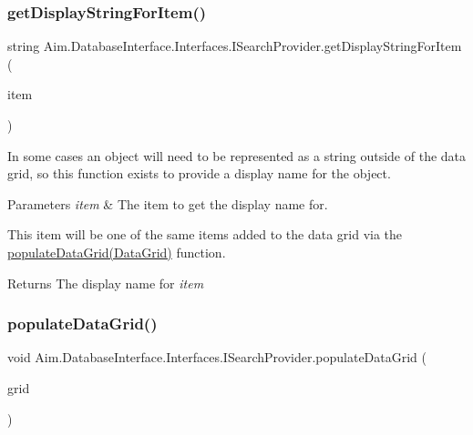 \subsubsection{\texorpdfstring{get\+Display\+String\+For\+Item()}{getDisplayStringForItem()}}
{\footnotesize\ttfamily string Aim.\+Database\+Interface.\+Interfaces.\+I\+Search\+Provider.\+get\+Display\+String\+For\+Item (\begin{DoxyParamCaption}\item[{Object}]{item }\end{DoxyParamCaption})}



In some cases an object will need to be represented as a string outside of the data grid, so this function exists to provide a \textquotesingle{}display name\textquotesingle{} for the object. 


\begin{DoxyParams}{Parameters}
{\em item} & The item to get the display name for.\\
\hline
\end{DoxyParams}
This item will be one of the same items added to the data grid via the \mbox{\hyperlink{interface_aim_1_1_database_interface_1_1_interfaces_1_1_i_search_provider_a5f8c9967784a7d938d79d7ffd2ce6628}{populate\+Data\+Grid(\+Data\+Grid)}} function. 

\begin{DoxyReturn}{Returns}
The display name for {\itshape item} 
\end{DoxyReturn}
\mbox{\label{interface_aim_1_1_database_interface_1_1_interfaces_1_1_i_search_provider_a5f8c9967784a7d938d79d7ffd2ce6628}} 
\subsubsection{\texorpdfstring{populate\+Data\+Grid()}{populateDataGrid()}}
{\footnotesize\ttfamily void Aim.\+Database\+Interface.\+Interfaces.\+I\+Search\+Provider.\+populate\+Data\+Grid (\begin{DoxyParamCaption}\item[{Data\+Grid}]{grid }\end{DoxyParamCaption})}



